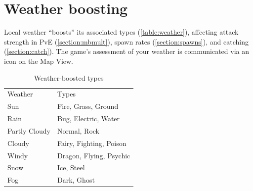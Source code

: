 \section{Weather boosting}
\label{section:weather}
Local weather ``boosts'' its associated types (\autoref{table:weather}), affecting attack strength
 in PvE (\autoref{section:mbmult}),
 spawn rates (\autoref{section:spawns}), and catching (\autoref{section:catch}).
The game's assessment of your weather is communicated via an icon on the Map View.
\begin{table}[ht]
\begin{center}
  \begin{tabular}{ll}
    Weather & Types \\
    \Midrule
    Sun & Fire, Grass, Ground \\
    Rain & Bug, Electric, Water \\
    Partly Cloudy & Normal, Rock \\
    Cloudy & Fairy, Fighting, Poison \\
    Windy & Dragon, Flying, Psychic \\
    Snow & Ice, Steel \\
    Fog & Dark, Ghost \\
  \end{tabular}
  \caption{Weather-boosted types}
  \label{table:weather}
\end{center}
\end{table}
